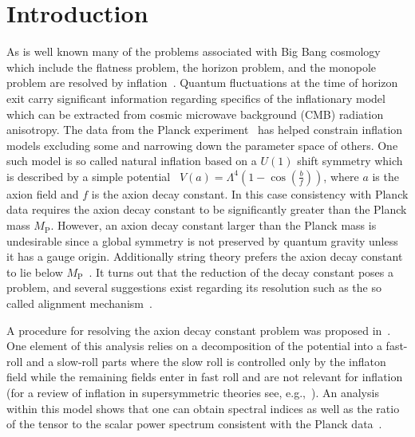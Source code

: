\documentclass[12pt]{article}
\begin{document}
\section{Introduction \label{sec:Introduction}}
As is well known many of the problems associated with Big Bang cosmology which include
the flatness problem, the horizon problem, and the monopole problem are resolved by inflation~\cite{Guth:1980zm, Starobinsky:1980te, Linde:1981mu, Albrecht:1982wi, Sato, Linde:1983gd}.
Quantum fluctuations at the time of horizon exit carry significant information regarding specifics of the inflationary model~\cite{Mukhanov+, Cheung:2007st} which can be extracted from cosmic microwave background (CMB) radiation anisotropy.
The data from the Planck experiment~\cite{Adam:2015rua, Ade:2015lrj, Array:2015xqh} has helped constrain inflation models excluding some and narrowing down the parameter space of others.
One such model is so called natural inflation based on a $U(1)$ shift symmetry which is described by a simple potential~\cite{Freese:1990rb, Adams:1992bn} $V\left(a\right) = \Lambda^4 \left(1 - \cos(\frac{b}{f})\right)$, where $a$ is the axion field and $f$ is the axion decay constant.
In this case consistency with Planck data requires the axion decay constant to be significantly greater than the Planck mass $M_\text{P}$.
However, an axion decay constant larger than the Planck mass is undesirable since a global symmetry is not preserved by quantum gravity unless it has a gauge origin.
Additionally string theory prefers the axion decay constant to lie below $M_\text{P}$~\cite{Banks:2003sx, Svrcek:2006yi}.
It turns out that the reduction of the decay constant poses a problem, and several suggestions exist regarding its resolution such as the so called alignment mechanism~\cite{Kim:2004rp, Long:2014dta}.

A procedure for resolving the axion decay constant problem was proposed in~\cite{Nath:2017ihp}.
One element of this analysis relies on a decomposition of the potential into a fast-roll and a slow-roll parts where the slow roll is controlled only by the inflaton field while the remaining fields enter in fast roll and are not relevant for inflation~\cite{Nath:2017ihp} (for a review of inflation in supersymmetric theories see, e.g.,~\cite{Nath:2016qzm}).
An analysis within this model shows that one can obtain spectral indices as well as the ratio of the tensor to the scalar power spectrum consistent with the Planck data~\cite{Adam:2015rua, Ade:2015lrj, Array:2015xqh}.
\end{document}
